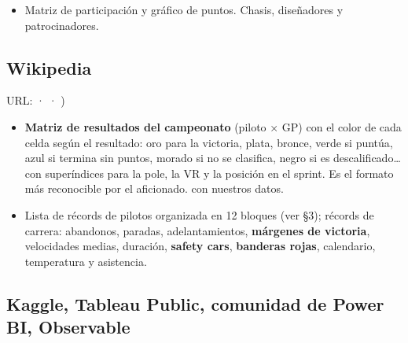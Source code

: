 \begin{itemize}
\item \si{} Matriz de participación y gráfico de puntos. \no{} Chasis, diseñadores y patrocinadores.
\end{itemize}

\subsection{Wikipedia}

URL: \href{https://en.wikipedia.org/wiki/List_of_Formula_One_driver_records}{} · \href{https://en.wikipedia.org/wiki/List_of_Formula_One_race_records}{} · \href{https://en.wikipedia.org/wiki/Grand_Slam_(Formula_One}{})

\begin{itemize}
\item \textbf{Matriz de resultados del campeonato} (piloto × GP) con el color de cada celda según el resultado: oro para la victoria, plata, bronce, verde si puntúa, azul si termina sin puntos, morado si no se clasifica, negro si es descalificado… con superíndices para la pole, la VR y la posición en el sprint. Es el formato más reconocible por el aficionado. \si{} con nuestros datos.
\item Lista de récords de pilotos organizada en 12 bloques (ver §3); récords de carrera: abandonos, paradas, adelantamientos, \textbf{márgenes de victoria}, velocidades medias, duración, \textbf{safety cars}, \textbf{banderas rojas}, calendario, temperatura y asistencia.
\end{itemize}

\subsection{Kaggle, Tableau Public, comunidad de Power BI, Observable}

